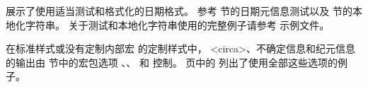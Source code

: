  展示了使用适当测试和格式化的日期格式。
参考  节的日期元信息测试以及  节的本地化字符串。
关于测试和本地化字符串使用的完整例子请参考  示例文件。

在标准样式或没有定制内部宏  的定制样式中，
<circa>、不确定信息和纪元信息的输出由  节中的宏包选项 、、 和  控制。
\pageref{bib:use:tab2} 页中的 列出了使用全部这些选项的例子。

